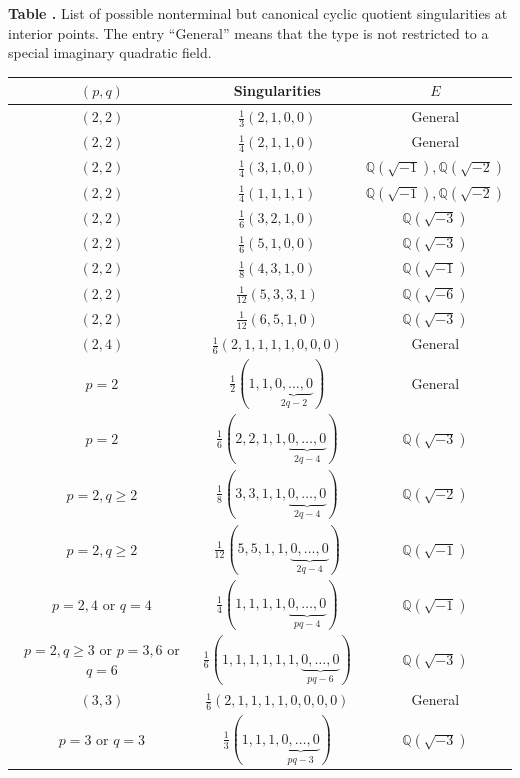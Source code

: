 \documentclass[11pt]{amsart}
\theoremstyle{plain}
\theoremstyle{definition}
\numberwithin{equation}{section}
\newcommand{\bbQ}{\mathbb{Q}}
\begin{document}
\renewcommand{\arraystretch}{1.2}
\begin{center}
\label{list_canonical_sing}
\textbf{Table \thetable.} 
List of possible nonterminal but canonical cyclic quotient singularities at interior points.
The entry ``General'' means that the type is not restricted to a special imaginary quadratic field.
\par\smallskip
\begin{tabular}{c|c|c}
    $(p,q)$ & Singularities & $E$ \\
    \hline
    $(2,2)$ & $\frac{1}{3}(2,1,0,0)$ & General \\
    $(2,2)$ & $\frac{1}{4}(2,1,1,0)$ & General \\
    $(2,2)$ & $\frac{1}{4}(3,1,0,0)$ & $\bbQ(\sqrt{-1}), \bbQ(\sqrt{-2})$ \\
    $(2,2)$ & $\frac{1}{4}(1,1,1,1)$ & $\bbQ(\sqrt{-1}), \bbQ(\sqrt{-2})$ \\
    $(2,2)$ & $\frac{1}{6}(3,2,1,0)$ & $\bbQ(\sqrt{-3})$ \\
    $(2,2)$ & $\frac{1}{6}(5,1,0,0)$ & $\bbQ(\sqrt{-3})$ \\
    $(2,2)$ & $\frac{1}{8}(4,3,1,0)$ & $\bbQ(\sqrt{-1})$ \\
    $(2,2)$ & $\frac{1}{12}(5,3,3,1)$ & $\bbQ(\sqrt{-6})$ \\
    $(2,2)$ & $\frac{1}{12}(6,5,1,0)$ & $\bbQ(\sqrt{-3})$ \\
    $(2,4)$ & $\frac{1}{6}(2,1,1,1,1,0,0,0)$ & General \\
    $p=2$ & $\frac{1}{2}(1,1,\underbrace{0,\ldots,0}_{2q-2})$ & General \\
    $p=2$ & $\frac{1}{6}(2,2,1,1,\underbrace{0,\ldots,0}_{2q-4})$ & $\bbQ(\sqrt{-3})$ \\
    $p=2, q\geq2$ & $\frac{1}{8}(3,3,1,1,\underbrace{0,\ldots,0}_{2q-4})$ & $\bbQ(\sqrt{-2})$ \\
    $p=2, q\geq2$ & $\frac{1}{12}(5,5,1,1,\underbrace{0,\ldots,0}_{2q-4})$ & $\bbQ(\sqrt{-1})$ \\
    $p=2,4$ or $q=4$ & $\frac{1}{4}(1,1,1,1,\underbrace{0,\ldots,0}_{pq-4})$ & $\bbQ(\sqrt{-1})$ \\
    $p=2, q\geq3$ or $p=3,6$ or $q=6$ & $\frac{1}{6}(1,1,1,1,1,1,\underbrace{0,\ldots,0}_{pq-6})$ & $\bbQ(\sqrt{-3})$ \\
    $(3,3)$ & $\frac{1}{6}(2,1,1,1,1,0,0,0,0)$ & General \\
    $p=3$ or $q=3$ & $\frac{1}{3}(1,1,1,\underbrace{0,\ldots,0}_{pq-3})$ & $\bbQ(\sqrt{-3})$
\end{tabular}
\end{center}
\end{document}
